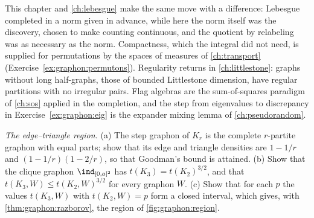 \begin{refsection}

This chapter and \cref{ch:lebesgue} make the same move with a difference: Lebesgue completed in a norm given in advance, while here the norm itself was the discovery, chosen to make counting continuous, and the quotient by relabeling was as necessary as the norm. Compactness, which the integral did not need, is supplied for permutations by the spaces of measures of \cref{ch:transport} (Exercise~\ref{ex:graphon:permutons}). Regularity returns in \cref{ch:littlestone}: graphs without long half-graphs, those of bounded Littlestone dimension, have regular partitions with no irregular pairs. Flag algebras are the sum-of-squares paradigm of \cref{ch:sos} applied in the completion, and the step from eigenvalues to discrepancy in Exercise~\ref{ex:graphon:eig} is the expander mixing lemma of \cref{ch:pseudorandom}.

\begin{exercises}
\item \consolidation\label{ex:graphon:region} \emph{The edge--triangle region.} (a) The step graphon of $K_r$ is the complete $r$-partite graphon with equal parts; show that its edge and triangle densities are $1-1/r$ and $(1-1/r)(1-2/r)$, so that Goodman's bound is attained. (b) Show that the clique graphon $\ind_{[0,a]^2}$ has $t(K_3)=t(K_2)^{3/2}$, and that $t(K_3,W)\le t(K_2,W)^{3/2}$ for every graphon $W$. (c) Show that for each $p$ the values $t(K_3,W)$ with $t(K_2,W)=p$ form a closed interval, which gives, with \cref{thm:graphon:razborov}, the region of \cref{fig:graphon:region}. 


\end{exercises}
\end{refsection}
